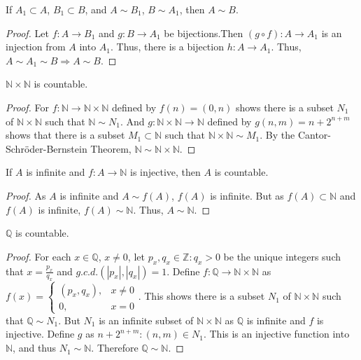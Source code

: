 \documentclass[crop=false,class=article,oneside]{standalone}
\begin{document}
            \begin{theorem}
            If $A_1 \subset A$, $B_1 \subset B$, and $A\sim B_1$, $B \sim A_1$, then $A\sim B$.
            \end{theorem}
            \begin{proof}
            Let $f:A\rightarrow B_1$ and $g:B\rightarrow A_1$ be bijections.Then $(g\circ f):A\rightarrow A_1$ is an injection from $A$ into $A_1$. Thus, there is a bijection $h:A\rightarrow A_1$. Thus, $A\sim A_1 \sim B\Rightarrow A\sim B$.
            \end{proof}
            \begin{theorem}
            $\mathbb{N}\times \mathbb{N}$ is countable.
            \end{theorem}
            \begin{proof}
            For $f:\mathbb{N} \rightarrow \mathbb{N}\times \mathbb{N}$ defined by $f(n) = (0,n)$ shows there is a subset $N_1$ of $\mathbb{N} \times \mathbb{N}$ such that $\mathbb{N}\sim N_1$. And $g:\mathbb{N}\times \mathbb{N} \rightarrow \mathbb{N}$ defined by $g(n,m) =n+2^{n+m}$ shows that there is a subset $M_1 \subset \mathbb{N}$ such that $\mathbb{N} \times \mathbb{N} \sim M_1$. By the Cantor-Schr\"{o}der-Bernstein Theorem, $\mathbb{N} \sim \mathbb{N}\times \mathbb{N}$.
            \end{proof}
            \begin{lemma}
            If $A$ is infinite and $f:A\rightarrow \mathbb{N}$ is injective, then $A$ is countable.
            \end{lemma}
            \begin{proof}
            As $A$ is infinite and $A\sim f(A)$, $f(A)$ is infinite. But as $f(A)\subset \mathbb{N}$ and $f(A)$ is infinite, $f(A)\sim \mathbb{N}$. Thus, $A\sim \mathbb{N}$. 
            \end{proof}
            \begin{theorem}
            $\mathbb{Q}$ is countable.
            \end{theorem}
            \begin{proof}
            For each $x\in \mathbb{Q}$, $x\ne 0$, let $p_x,q_x\in\mathbb{Z}:q_x>0$ be the unique integers such that $x = \frac{p_x}{q_x}$ and $g.c.d.(|p_x|,|q_x|)=1$. Define $f:\mathbb{Q}\rightarrow \mathbb{N}\times \mathbb{N}$ as $f(x) = \begin{cases}(p_x,q_x), & x\ne 0 \\ 0, & x=0\end{cases}$. This shows there is a subset $N_1$ of $\mathbb{N}\times \mathbb{N}$ such that $\mathbb{Q}\sim N_1$. But $N_1$ is an infinite subset of $\mathbb{N}\times\mathbb{N}$ as $\mathbb{Q}$ is infinite and $f$ is injective. Define $g$ as $n+2^{n+m}:(n,m)\in N_1$. This is an injective function into $\mathbb{N}$, and thus $N_1 \sim \mathbb{N}$. Therefore $\mathbb{Q}\sim \mathbb{N}$.
            \end{proof}
\end{document}
